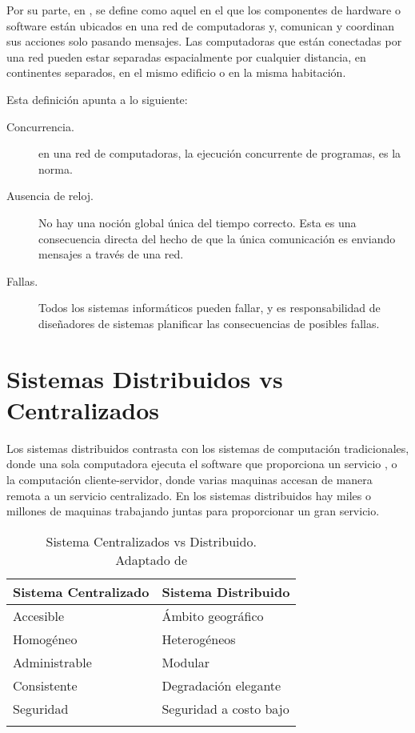 Por su parte, en , se define como aquel en el que los componentes de hardware o software están ubicados en una red de  computadoras y, comunican y coordinan sus acciones solo pasando mensajes. Las computadoras que están conectadas por una red pueden estar separadas espacialmente por cualquier distancia, en continentes separados, en el mismo edificio o en la misma habitación.

Esta definición  apunta a lo siguiente:
\begin{description}
	\item[{Concurrencia.}] en una red de computadoras, la ejecución concurrente de programas, es la norma. 
	
	\item[{Ausencia de reloj.}]	 No hay una noción global única del tiempo correcto. Esta es una consecuencia directa del hecho de que la única comunicación es enviando mensajes a través de una red.
	
	\item[{Fallas.}] Todos los sistemas informáticos pueden fallar, y es responsabilidad de diseñadores de sistemas  planificar las consecuencias de posibles fallas.  
\end{description}

\section{ Sistemas Distribuidos vs Centralizados}
Los sistemas distribuidos contrasta con los sistemas de computación tradicionales,  donde una sola computadora ejecuta el software que proporciona un \gls{servicio} , o la computación \gls{cliente-servidor}, donde varias maquinas accesan de manera remota a un servicio centralizado.
En los sistemas distribuidos hay miles o millones de maquinas trabajando juntas para proporcionar un gran servicio. 

\begin{table}[h]
	\footnotesize%
	\begin{center}
		\footnotesize
		\begin{tabular}{ll}
			\toprule
			Sistema Centralizado &  Sistema Distribuido \\
			\midrule
			\quad Accesible &  \'Ambito geográfico    \\
			\quad Homog\'eneo    &  Heterogéneos  \\
			\quad Administrable     &  Modular  \\
			\quad Consistente   & Degradación elegante \\
			\quad Seguridad  & Seguridad a costo bajo  \\
			\addlinespace 
			\bottomrule
		\end{tabular}
	\end{center}
	\caption{Sistema Centralizados vs Distribuido. \\ Adaptado de \RD }
	\label{tab:centra-dist}
\end{table}

